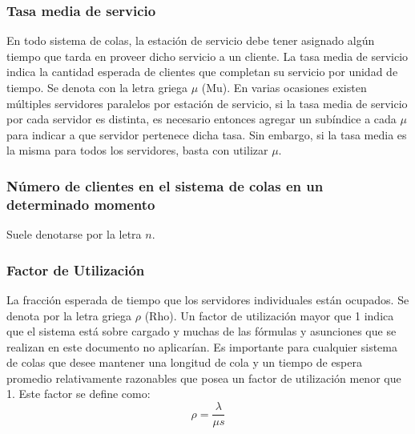 \documentclass{article}
\begin{document}
\subsubsection{Tasa media de servicio}
En todo sistema de colas, la estación de servicio debe tener asignado algún 
tiempo que tarda en proveer dicho servicio a un cliente.  La tasa media de
servicio indica la cantidad esperada de clientes que completan su servicio 
por unidad de tiempo. Se denota con la letra griega $\mu$ (Mu).
En varias ocasiones existen múltiples servidores paralelos por estación 
de servicio, si la tasa media de servicio por cada servidor es distinta,
es necesario entonces agregar un subíndice a cada $\mu$ para indicar
a que servidor pertenece dicha tasa. Sin embargo, si la tasa media
es la misma para todos los servidores, basta con utilizar $\mu$.
\subsubsection{Número de clientes en el sistema de colas en un determinado momento}
Suele denotarse por la letra $n$.
\subsubsection{Factor de Utilización}
La fracción esperada de tiempo que los servidores individuales están ocupados.
Se denota por la letra griega $\rho$ (Rho). Un factor de utilización 
mayor que 1 indica que el sistema está sobre cargado y muchas de las fórmulas 
y asunciones que se realizan en este documento no aplicarían. Es importante 
para cualquier sistema de colas que desee mantener una longitud de cola y un tiempo
de espera promedio relativamente razonables que posea un factor de utilización
menor que 1. Este factor se define como:
\begin{equation} 
	\label{eq9:rho}
	\rho = \frac{\lambda}{\mu s}
\end{equation}
\end{document}
